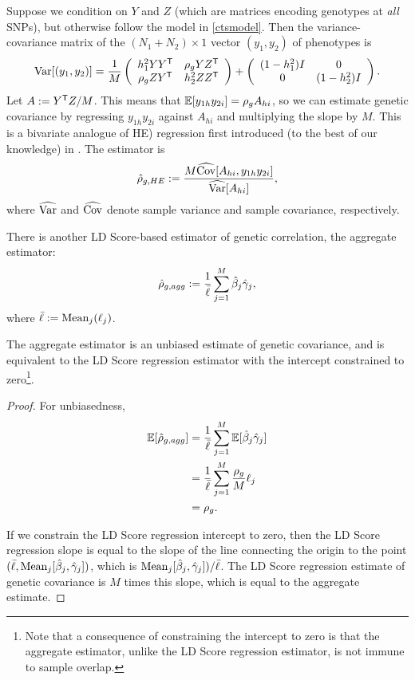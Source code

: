 \documentclass[11pt]{article}
\numberwithin{equation}{section}
\numberwithin{definition}{section}
\numberwithin{thm}{section}
\numberwithin{lemma}{section}
\numberwithin{prop}{section}
\numberwithin{cor}{section}
\numberwithin{hyp}{section}
\begin{document}
Suppose we condition on $Y$ and $Z$
(which are matrices encoding genotypes at \emph{all} SNPs),
but otherwise follow the model in \ref{ctsmodel}.
Then the variance-covariance matrix of the $(N_1+N_2)\times 1$ vector $(y_1,y_2)$ of phenotypes is
\[
	\mathrm{Var}[(y_1,y_2)]  =  \frac{1}{M} \left( \begin{array}{cc}
		h_{1}^2 YY^{\mathsf{T}}      &  \rho_g YZ^{\mathsf{T}} 	\\
		\rho_g ZY^{\mathsf{T}}  &  h_{2}^2 ZZ^{\mathsf{T}}
	\end{array} \right)
	+
	\left( \begin{array}{cc}
		(1-h_{1}^2)I & 0 	\\
		0              & (1-h_{2}^2)I
	\end{array} \right).
\]
Let $A := Y^{\mathsf{T}}Z/M$. 
This means that $\mathbb{E}[y_{1h}y_{2i}] = \rho_g A_{hi}$,
so we can estimate genetic covariance by regressing $y_{1h}y_{2i}$ against $A_{hi}$ and multiplying the slope by $M$.
This is a bivariate analogue of HE) regression first introduced (to the best of our knowledge) in \cite{price2011}.
The estimator is
\begin{equation}
	\hat{\rho}_{g,HE} :=  \frac{M\widehat{\mathrm{Cov}}[A_{hi}, y_{1h}y_{2i}]}{\widehat{\mathrm{Var}}[A_{hi}]},
\end{equation}
where $\widehat{\mathrm{Var}}$ and $\widehat{\mathrm{Cov}}$ denote sample variance and sample covariance, respectively.

There is another LD Score-based estimator of genetic correlation, 
the aggregate estimator:	
\begin{equation}
	\hat{\rho}_{g, agg} := \frac{1}{\bar{\ell}}\sum_{j=1}^M \hat{\beta}_j\hat{\gamma}_j,
\end{equation}
where $\bar{\ell} := \mathrm{Mean}_j(\ell_j)$.
\begin{prop}\label{agg}
The aggregate estimator is an unbiased estimate of genetic covariance, and is
equivalent to the LD Score regression estimator with the intercept constrained to zero\footnote{
Note that a consequence of constraining the intercept to zero is that the aggregate estimator, 
unlike the LD Score regression estimator, is not immune to sample overlap.}. 

\end{prop}
\begin{proof}
For unbiasedness,
\begin{align*}
	\mathbb{E}[\hat{\rho}_{g,agg}]
&= 
	\frac{1}{\bar{\ell}} \sum_{j=1}^M \mathbb{E}[\hat{\beta}_j\hat{\gamma}_j]\\
&=
	\frac{1}{\bar{\ell}} \sum_{j=1}^M \frac{\rho_g}{M}\ell_j\\
&=
	\rho_g.
\end{align*}

If we constrain the LD Score regression intercept to zero,
then the LD Score regression slope is equal to the slope of the line connecting the origin to the point
$(\bar{\ell}, \mathrm{Mean}_j[\hat{\beta}_j,\hat{\gamma}_j])$, which is 
$\mathrm{Mean}_j[\hat{\beta}_j,\hat{\gamma}_j]) / \bar{\ell}$.
The LD Score regression estimate of genetic covariance is $M$ times this slope, 
which is equal to the aggregate estimate.
\end{proof}
\end{document}

